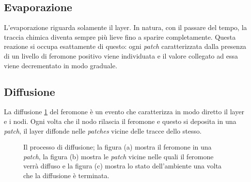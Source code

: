 \subsection{Evaporazione}
L'evaporazione riguarda solamente il layer. In natura, con il passare del tempo, la traccia chimica diventa sempre più
lieve fino a sparire completamente. Questa reazione si occupa esattamente di questo: ogni \textit{patch} caratterizzata
dalla presenza di un livello di feromone positivo viene individuata e il valore collegato ad essa viene decrementato in modo graduale.
\subsection{Diffusione}
La diffusione \cref{fig:diffusion} del feromone è un evento che caratterizza in modo diretto il layer e i nodi. Ogni volta che il nodo rilascia il feromone e
questo si deposita in una \textit{patch}, il layer diffonde nelle \textit{patches} vicine delle tracce dello stesso.
\begin{figure}[ht]
    \centering
    \caption{Il processo di diffusione; la figura (a) mostra il feromone in una \textit{patch}, la figura (b) mostra le \textit{patch} vicine nelle 
    quali il feromone verrà diffuso e la figura (c) mostra lo stato dell'ambiente una volta che la diffusione è terminata.}\label{fig:diffusion}
\end{figure}\newline
